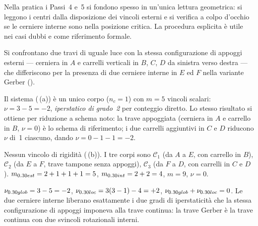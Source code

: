 \begin{oss}
	Nella pratica i Passi~4 e~5 si fondono spesso in
	un'unica lettura geometrica: si leggono i centri
	dalla disposizione dei vincoli esterni e si verifica
	a colpo d'occhio se le cerniere interne sono nella
	posizione critica. La procedura esplicita è utile
	nei casi dubbi e come riferimento formale.
\end{oss}




\begin{esempio}
	\label{ex:trave_gerber}
	Si confrontano due travi di uguale luce con la stessa
	configurazione di appoggi esterni --- cerniera in $A$
	e carrelli verticali in $B$, $C$, $D$ da sinistra verso
	destra --- che differiscono per la presenza di due
	cerniere interne in $E$ ed $F$ nella variante Gerber ().
	


	
	
	\begin{svolgimento}
		Il sistema (\,(a))
		è un unico corpo ($n_c = 1$) con
		$m = 5$ vincoli scalari: $\nu = 3 - 5 = -2$,
		\textit{iperstatico di grado~2} per conteggio
		diretto. Lo stesso risultato si ottiene per
		riduzione a schema noto: la trave appoggiata
		(cerniera in $A$ e carrello in $B$, $\nu = 0$)
		è lo schema di riferimento; i due carrelli
		aggiuntivi in $C$ e $D$ riducono $\nu$ di~1
		ciascuno, dando $\nu = 0 - 1 - 1 = -2$.
	\end{svolgimento}
	
	\esottotit{Trave Gerber.}
	\begin{svolgimento}
		
		\esottotit{Passi~1--2.}
		Nessun vincolo di rigidità (\,(b)).
		I tre corpi sono $\mathcal{C}_1$ (da $A$ a $E$, con carrello in
		$B$), $\mathcal{C}_2$ (da $E$ a $F$, trave
		tampone senza appoggi), $\mathcal{C}_3$ (da $F$
		a $D$, con carrelli in $C$ e $D$).
		$m_{\rm est} = 2+1+1+1 = 5$,
		$m_{\rm int} = 2+2 = 4$, $m = 9$, $\nu = 0$.
		
		\esottotit{Passo~3.}
		$\nu_{\rm glob} = 3 - 5 = -2$,
		$\nu_{\rm loc} = 3(3-1) - 4 = +2$,
		$\nu_{\rm glob} + \nu_{\rm loc} = 0$.
		Le due cerniere interne liberano esattamente i
		due gradi di iperstaticità che la stessa
		configurazione di appoggi imponeva alla trave
		continua: la trave Gerber è la trave continua
		con due svincoli rotazionali interni.
		

\end{svolgimento}
\end{esempio}
